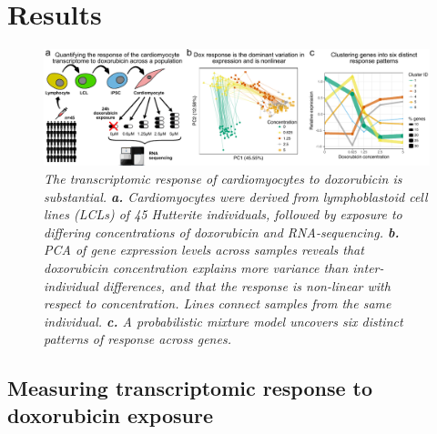 \documentclass{article}
\begin{document}
\section*{Results}

\begin{figure}
\begin{center}
    \includegraphics[width=1\textwidth]{../figures/fig1.pdf} 
        \caption{\it{The transcriptomic response of cardiomyocytes to doxorubicin is substantial. \textbf{a.} Cardiomyocytes were derived from lymphoblastoid cell lines (LCLs) of 45 Hutterite individuals, followed by exposure to differing concentrations of doxorubicin and RNA-sequencing. \textbf{b.} PCA of gene expression levels across samples reveals that doxorubicin concentration explains more variance than inter-individual differences, and that the response is non-linear with respect to concentration. Lines connect samples from the same individual. \textbf{c.} A probabilistic mixture model uncovers six distinct patterns of response across genes.}}
    \label{fig1}
    \end{center}
\end{figure}

\subsection*{Measuring transcriptomic response to doxorubicin exposure}
\end{document}
